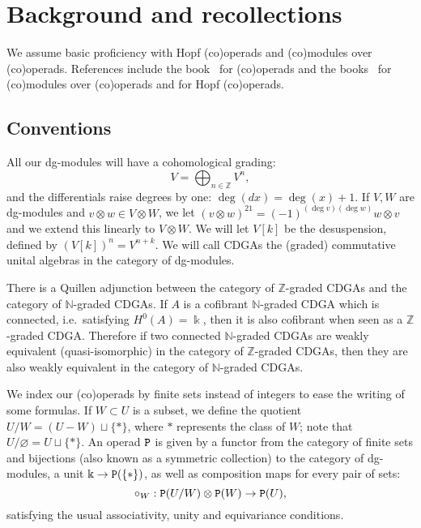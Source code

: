 \section{Background and recollections}
\label{cnf.sec.backgr-recoll}

We assume basic proficiency with Hopf (co)operads and (co)modules over (co)operads.
References include the book~\cite{LodayVallette2012} for (co)operads and the books~\cite{Fresse2009,Fresse2017} for (co)modules over (co)operads and for Hopf (co)operads.

\subsection{Conventions}
\label{cnf.sec.conventions}

All our dg-modules will have a cohomological grading:
\[ V = \bigoplus_{n \in \mathbb{Z}} V^{n}, \]
and the differentials raise degrees by one: $\deg(dx) = \deg(x) + 1$.
If $V,W$ are dg-modules and $v \otimes w \in V \otimes W$, we let $(v \otimes w)^{21} = (-1)^{(\deg v) (\deg w)} w \otimes v$ and we extend this linearly to $V \otimes W$.
We will let $V[k]$ be the desuspension, defined by $(V[k])^{n} = V^{n+k}$.
We will call CDGAs the (graded) commutative unital algebras in the category of dg-modules.

\begin{remark}
  \label{cnf.rmk.grading}
  There is a Quillen adjunction between the category of $\mathbb{Z}$-graded CDGAs and the category of $\mathbb{N}$-graded CDGAs.
  If $A$ is a cofibrant $\mathbb{N}$-graded CDGA which is connected, i.e.\ satisfying $H^{0}(A) = \Bbbk$, then it is also cofibrant when seen as a $\mathbb{Z}$-graded CDGA.
  Therefore if two connected $\mathbb{N}$-graded CDGAs are weakly equivalent (quasi-isomorphic) in the category of $\mathbb{Z}$-graded CDGAs, then they are also weakly equivalent in the category of $\mathbb{N}$-graded CDGAs.
\end{remark}

We index our (co)operads by finite sets instead of integers to ease the writing of some formulas.
If $W \subset U$ is a subset, we define the quotient $U/W = (U - W) \sqcup \{*\}$, where $*$ represents the class of $W$; note that $U/\varnothing = U \sqcup \{ * \}$.
An operad $\mathtt{P}$ is given by a functor from the category of finite sets and bijections (also known as a symmetric collection) to the category of dg-modules, a unit $\Bbbk \to \mathtt{P}(\{*\})$, as well as composition maps for every pair of sets:
\[ \circ_{W} : \mathtt{P}(U/W) \otimes \mathtt{P}(W) \to \mathtt{P}(U), \]
satisfying the usual associativity, unity and equivariance conditions.

